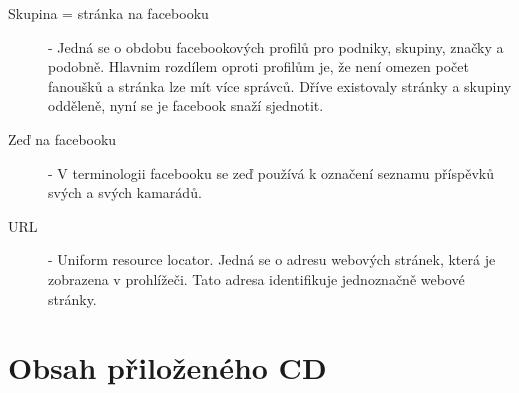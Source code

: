 \documentclass[thesis=M,czech]{FITthesis}[2013/05/10]
\begin{document}
\begin{description}
	\item[Skupina = stránka na facebooku] - Jedná se o obdobu facebookových profilů pro podniky, skupiny, značky a podobně. Hlavnim rozdílem oproti profilům je, že není omezen počet fanoušků a stránka lze mít více správců. Dříve existovaly stránky a skupiny odděleně, nyní se je facebook snaží sjednotit.
	\item[Zeď na facebooku] - V terminologii facebooku se zeď používá k označení seznamu příspěvků svých a svých kamarádů.
	\item[URL] - Uniform resource locator. Jedná se o adresu webových stránek, která je zobrazena v prohlížeči. Tato adresa identifikuje jednoznačně webové stránky. 
\end{description}

\chapter{Obsah přiloženého CD}

\begin{figure}
\end{figure}
\end{document}
